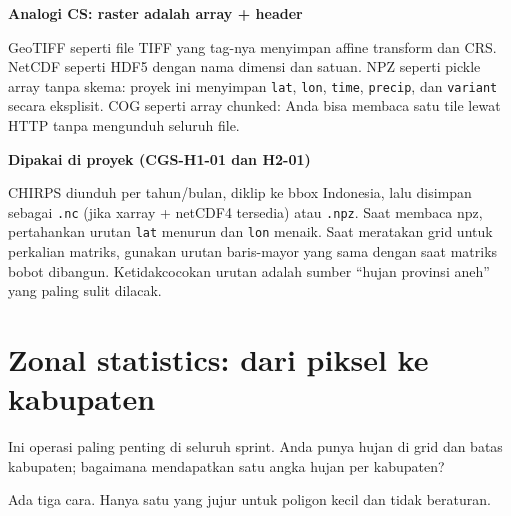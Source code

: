 \documentclass[9pt,a4paper]{extarticle}
\newcommand{\code}[1]{\texttt{\small\color{ink}#1}}
\newenvironment{csbox}[1]
  {\begin{tcolorbox}[enhanced,breakable,colback=tealbg,colframe=tealbg,boxrule=0pt,arc=1.1mm,
    left=3mm,right=2.2mm,top=1.4mm,bottom=1.4mm,borderline west={2.2pt}{0pt}{accent},
    before skip=3pt,after skip=3pt]
   \textcolor{accent}{\sffamily\bfseries #1}\par\vspace{0.5pt}}
  {\end{tcolorbox}}
\newenvironment{projectbox}[1]
  {\begin{tcolorbox}[enhanced,breakable,colback=bg,colframe=bg,boxrule=0pt,arc=1.1mm,
    left=3mm,right=2.2mm,top=1.4mm,bottom=1.4mm,borderline west={2.2pt}{0pt}{ink},
    before skip=3pt,after skip=3pt]
   \textcolor{ink}{\sffamily\bfseries #1}\par\vspace{0.5pt}}
  {\end{tcolorbox}}
\begin{document}
\begin{csbox}{Analogi CS: raster adalah array + header}
GeoTIFF seperti file TIFF yang tag-nya menyimpan affine transform dan CRS. NetCDF seperti HDF5 dengan nama dimensi dan satuan. NPZ seperti pickle array tanpa skema: proyek ini menyimpan \code{lat}, \code{lon}, \code{time}, \code{precip}, dan \code{variant} secara eksplisit. COG seperti array chunked: Anda bisa membaca satu tile lewat HTTP tanpa mengunduh seluruh file.
\end{csbox}

\begin{projectbox}{Dipakai di proyek (CGS-H1-01 dan H2-01)}
CHIRPS diunduh per tahun/bulan, diklip ke bbox Indonesia, lalu disimpan sebagai \code{.nc} (jika xarray + netCDF4 tersedia) atau \code{.npz}. Saat membaca npz, pertahankan urutan \code{lat} menurun dan \code{lon} menaik. Saat meratakan grid untuk perkalian matriks, gunakan urutan baris-mayor yang sama dengan saat matriks bobot dibangun. Ketidakcocokan urutan adalah sumber ``hujan provinsi aneh'' yang paling sulit dilacak.
\end{projectbox}

\section{Zonal statistics: dari piksel ke kabupaten}

Ini operasi paling penting di seluruh sprint. Anda punya hujan di grid dan batas kabupaten; bagaimana mendapatkan satu angka hujan per kabupaten?

Ada tiga cara. Hanya satu yang jujur untuk poligon kecil dan tidak beraturan.
\end{document}
